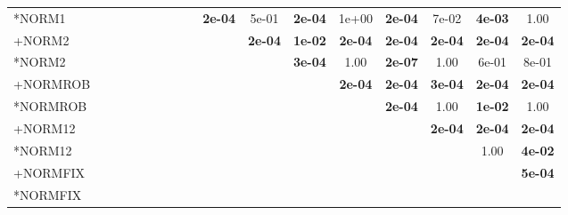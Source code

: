 \begin{table}[t]
{\begin{tabular}{lcccccccccccccccc}
*NORM1 &  &  &  &  &  &  &  &  & \textbf{2e-04} & 5e-01 & \textbf{2e-04} & 1e+00 & \textbf{2e-04} & 7e-02 & \textbf{4e-03} & 1.00 \\
+NORM2 &  &  &  &  &  &  &  &  &  & \textbf{2e-04} & \textbf{1e-02} & \textbf{2e-04} & \textbf{2e-04} & \textbf{2e-04} & \textbf{2e-04} & \textbf{2e-04} \\
*NORM2 &  &  &  &  &  &  &  &  &  &  & \textbf{3e-04} & 1.00 & \textbf{2e-07} & 1.00 & 6e-01 & 8e-01 \\
+NORMROB &  &  &  &  &  &  &  &  &  &  &  & \textbf{2e-04} & \textbf{2e-04} & \textbf{3e-04} & \textbf{2e-04} & \textbf{2e-04} \\
*NORMROB &  &  &  &  &  &  &  &  &  &  &  &  & \textbf{2e-04} & 1.00 & \textbf{1e-02} & 1.00 \\
+NORM12 &  &  &  &  &  &  &  &  &  &  &  &  &  & \textbf{2e-04} & \textbf{2e-04} & \textbf{2e-04} \\
*NORM12 &  &  &  &  &  &  &  &  &  &  &  &  &  &  & 1.00 & \textbf{4e-02} \\
+NORMFIX &  &  &  &  &  &  &  &  &  &  &  &  &  &  &  & \textbf{5e-04} \\
*NORMFIX &  &  &  &  &  &  &  &  &  &  &  &  &  &  &  &  \\
\bottomrule
\end{tabular}
}
\end{table}

